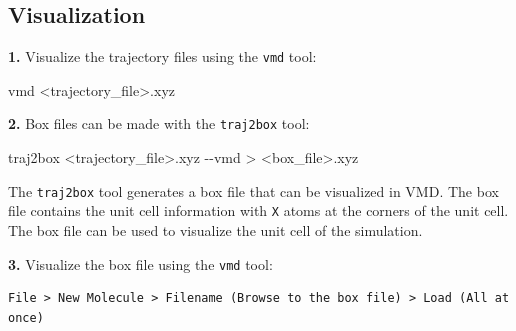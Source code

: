 \documentclass[
  letterpaper,
]{article}
\newenvironment{Shaded}{\begin{snugshade}}{\end{snugshade}}
\newcommand{\AttributeTok}[1]{\textcolor[rgb]{0.40,0.45,0.13}{#1}}
\newcommand{\ExtensionTok}[1]{\textcolor[rgb]{0.00,0.23,0.31}{#1}}
\newcommand{\NormalTok}[1]{\textcolor[rgb]{0.00,0.23,0.31}{#1}}
\newcommand{\OperatorTok}[1]{\textcolor[rgb]{0.37,0.37,0.37}{#1}}
\begin{document}
\hypertarget{visualization}{%
\subsection*{Visualization}\label{visualization}}


\textbf{1.} Visualize the trajectory files using the \texttt{vmd} tool:

\begin{Shaded}
\begin{Highlighting}[]
\ExtensionTok{vmd} \OperatorTok{\textless{}}\NormalTok{trajectory\_file}\OperatorTok{\textgreater{}}\NormalTok{.xyz}
\end{Highlighting}
\end{Shaded}

\textbf{2.} Box files can be made with the \texttt{traj2box} tool:

\begin{Shaded}
\begin{Highlighting}[]
\ExtensionTok{traj2box} \OperatorTok{\textless{}}\NormalTok{trajectory\_file}\OperatorTok{\textgreater{}}\NormalTok{.xyz }\AttributeTok{{-}{-}vmd} \OperatorTok{\textgreater{}} \OperatorTok{\textless{}}\NormalTok{box\_file}\OperatorTok{\textgreater{}}\NormalTok{.xyz}
\end{Highlighting}
\end{Shaded}

\begin{tcolorbox}[enhanced jigsaw, toptitle=1mm, opacitybacktitle=0.6, colframe=quarto-callout-note-color-frame, toprule=.15mm, breakable, bottomrule=.15mm, left=2mm, title=\textcolor{quarto-callout-note-color}{\faInfo}\hspace{0.5em}{Note}, titlerule=0mm, leftrule=.75mm, bottomtitle=1mm, coltitle=black, arc=.35mm, rightrule=.15mm, opacityback=0, colback=white, colbacktitle=quarto-callout-note-color!10!white]

The \texttt{traj2box} tool generates a box file that can be visualized
in VMD. The box file contains the unit cell information with \texttt{X}
atoms at the corners of the unit cell. The box file can be used to
visualize the unit cell of the simulation.

\end{tcolorbox}

\textbf{3.} Visualize the box file using the \texttt{vmd} tool:

\begin{verbatim}
File > New Molecule > Filename (Browse to the box file) > Load (All at once)
\end{verbatim}
\end{document}
